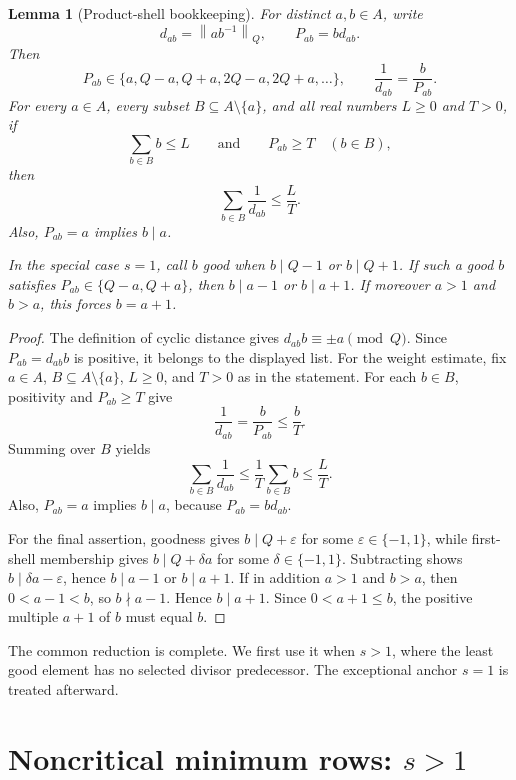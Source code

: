\documentclass[11pt]{article}
\newtheorem{lemma}[theorem]{Lemma}
\theoremstyle{definition}
\theoremstyle{remark}
\newcommand{\normQ}[1]{\left\lVert #1\right\rVert_Q}
\begin{document}
\begin{lemma}[Product-shell bookkeeping]\label{lem:shell-bookkeeping}
For distinct \(a,b\in A\), write
\[
 d_{ab}=\normQ{ab^{-1}},\qquad P_{ab}=bd_{ab}.
\]
Then
\[
 P_{ab}\in\{a,Q-a,Q+a,2Q-a,2Q+a,\ldots\},
 \qquad \frac1{d_{ab}}=\frac b{P_{ab}}.
\]
For every \(a\in A\), every subset \(B\subseteq A\setminus\{a\}\),
and all real numbers \(L\ge0\) and \(T>0\), if
\[
 \sum_{b\in B}b\le L
 \qquad\text{and}\qquad
 P_{ab}\ge T\quad(b\in B),
\]
then
\[
 \sum_{b\in B}\frac1{d_{ab}}\le\frac LT.
\]
Also, \(P_{ab}=a\) implies \(b\mid a\).

In the special case \(s=1\), call \(b\) good when
\(b\mid Q-1\) or \(b\mid Q+1\).  If such a good \(b\) satisfies
\(P_{ab}\in\{Q-a,Q+a\}\), then \(b\mid a-1\) or \(b\mid a+1\).
If moreover \(a>1\) and \(b>a\), this forces \(b=a+1\).
\end{lemma}

\begin{proof}
The definition of cyclic distance gives \(d_{ab}b\equiv\pm a\pmod Q\).
Since \(P_{ab}=d_{ab}b\) is positive, it belongs to the displayed list.
For the weight estimate, fix \(a\in A\),
\(B\subseteq A\setminus\{a\}\), \(L\ge0\), and \(T>0\) as in the
statement.  For each \(b\in B\), positivity and \(P_{ab}\ge T\) give
\[
 \frac1{d_{ab}}=\frac b{P_{ab}}\le\frac bT.
\]
Summing over \(B\) yields
\[
 \sum_{b\in B}\frac1{d_{ab}}
 \le\frac1T\sum_{b\in B}b\le\frac LT.
\]
Also, \(P_{ab}=a\) implies \(b\mid a\), because \(P_{ab}=bd_{ab}\).

For the final assertion, goodness gives \(b\mid Q+\varepsilon\) for some
\(\varepsilon\in\{-1,1\}\), while first-shell membership gives
\(b\mid Q+\delta a\) for some \(\delta\in\{-1,1\}\).  Subtracting
shows \(b\mid\delta a-\varepsilon\), hence \(b\mid a-1\) or
\(b\mid a+1\).  If in addition \(a>1\) and \(b>a\), then
\(0<a-1<b\), so \(b\nmid a-1\).  Hence \(b\mid a+1\).  Since
\(0<a+1\le b\), the positive multiple \(a+1\) of \(b\) must equal
\(b\).
\end{proof}

The common reduction is complete.  We first use it when \(s>1\), where the
least good element has no selected divisor predecessor.  The exceptional
anchor \(s=1\) is treated afterward.

\section{Noncritical minimum rows: \texorpdfstring{\(s>1\)}{s > 1}}\label{sec:s-positive}
\end{document}
